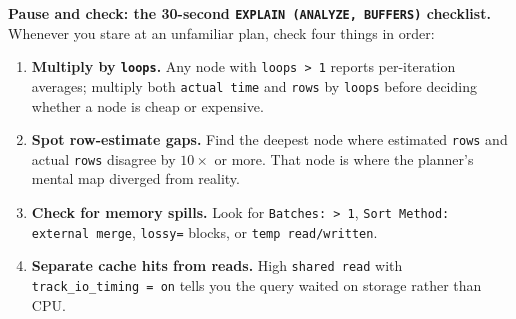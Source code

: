 \begin{recoverybox}
\textbf{Pause and check: the 30-second \texttt{EXPLAIN (ANALYZE, BUFFERS)} checklist.}
Whenever you stare at an unfamiliar plan, check four things in order:
\begin{enumerate}
  \item \textbf{Multiply by \texttt{loops}.} Any node with \texttt{loops > 1} reports per-iteration averages; multiply both \texttt{actual time} and \texttt{rows} by \texttt{loops} before deciding whether a node is cheap or expensive.
  \item \textbf{Spot row-estimate gaps.} Find the deepest node where estimated \texttt{rows} and actual \texttt{rows} disagree by $10\times$ or more. That node is where the planner's mental map diverged from reality.
  \item \textbf{Check for memory spills.} Look for \texttt{Batches: > 1}, \texttt{Sort Method: external merge}, \texttt{lossy=} blocks, or \texttt{temp read/written}.
  \item \textbf{Separate cache hits from reads.} High \texttt{shared read} with \texttt{track\_io\_timing = on} tells you the query waited on storage rather than CPU.
\end{enumerate}
\end{recoverybox}

